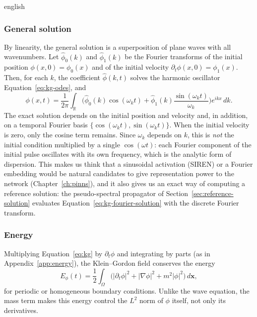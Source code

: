 \documentclass[12pt,letterpaper,twoside]{book}
\newcommand{\abs}[1]{\left\lvert #1 \right\rvert}
\begin{document}
\begin{hyphenrules}{english}
\subsubsection{General solution}
By linearity, the general solution is a superposition of plane waves with all wavenumbers. Let
$\hat\phi_0(k)$ and $\hat\phi_1(k)$ be the Fourier transforms of the initial position
$\phi(x,0)=\phi_0(x)$ and of the initial velocity $\partial_t\phi(x,0)=\phi_1(x)$. Then, for each $k$,
the coefficient $\hat\phi(k,t)$ solves the harmonic oscillator Equation~\eqref{eq:kg-odes}, and
\begin{equation}
  \phi(x,t)=\frac{1}{2\pi}\int_{\mathbb{R}}\Big(\hat\phi_0(k)\cos(\omega_kt)
  +\hat\phi_1(k)\frac{\sin(\omega_kt)}{\omega_k}\Big)e^{ikx}\,d k.
  \label{eq:kg-fourier-solution}
\end{equation}
The exact solution depends on the initial position and velocity and, in addition, on a temporal
Fourier basis $\{\cos(\omega_kt),\sin(\omega_kt)\}$. When the initial velocity is zero, only the cosine
term remains. Since $\omega_k$ depends on $k$, this is \emph{not} the initial condition multiplied by a
single $\cos(\omega t)$: each Fourier component of the initial pulse oscillates with its own frequency,
which is the analytic form of dispersion. This makes us think that a sinusoidal activation (SIREN) or a
Fourier embedding would be natural candidates to give representation power to the network
(Chapter~\ref{ch:pinns}), and it also gives us an exact way of computing a reference solution: the
pseudo-spectral propagator of Section~\ref{sec:reference-solution} evaluates
Equation~\eqref{eq:kg-fourier-solution} with the discrete Fourier transform.

\subsubsection{Energy}
Multiplying Equation~\eqref{eq:kg} by $\partial_t\phi$ and integrating by parts (as in Appendix~\ref{app:energy}), the
Klein--Gordon field conserves the energy
\begin{equation}
  E_\phi(t)=\frac12\int_\Omega\Big(\abs{\partial_t\phi}^2+\abs{\nabla\phi}^2+m^2\abs{\phi}^2\Big)\,d\mathbf{x},
  \label{eq:kg-energy}
\end{equation}
for periodic or homogeneous boundary conditions. Unlike the wave equation, the mass term makes this
energy control the $L^2$ norm of $\phi$ itself, not only its derivatives.


\end{hyphenrules}
\end{document}
